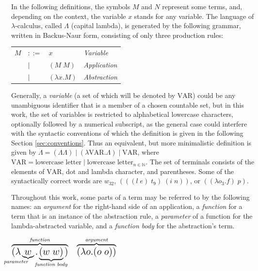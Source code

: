 \documentclass[table, a4paper, 10pt]{article}
\begin{document}
In the following definitions, the symbols $M$ and $N$ represent some terms, and,
depending on the context, the variable $x$ stands for any variable.
The language of $\lambda$-calculus, called $\Lambda$ (capital lambda), is generated by the following
grammar, written in Backus-Naur form, consisting of only three production rules:

\begin{center}
\begin{tabular}{llll}
$M$ &$::=$             &$x$              & {\small\hspace{0.4cm}\textit{Variable}}\\
    &\hspace{0.1cm}$|$ &$(M\;M)$         & {\small\hspace{0.4cm}\textit{Application}}\\
    &\hspace{0.1cm}$|$ &$(\lambda x.M)$  & {\small\hspace{0.4cm}\textit{Abstraction}}
\end{tabular}
\end{center}
Generally, a \textit{variable} (a set of which will be denoted by $\mathrm{VAR}$)
could be any unambiguous identifier 
that is a member of a chosen countable set, but in this work, the set
of variables is restricted to
alphabetical lowercase characters, optionally followed by a numerical subscript,
as the general case could interfere with the syntactic conventions
of which the definition is given in the following Section \ref{sec:conventions}.
Thus an equivalent, but more minimalistic definition is given by
$\Lambda = (\Lambda \Lambda)\;|\;(\lambda \mathrm{VAR}.\Lambda)\;|\;\mathrm{VAR}$, where
$\mathrm{VAR} = \text{lowercase letter}\;|\;\text{lowercase letter}_{n \in \mathbb{N}}$.
The set of terminals consists of the elements of $\mathrm{VAR}$, dot and lambda character, and parentheses.
Some of the syntactically correct words are $w_{32}$, $(((l\;e)\;t_9)\;(i\;n))$, or $((\lambda o_3.f)\;p)$.

Throughout this work, some parts of a term may be referred to by the following names:
an \textit{argument} for the right-hand side of an application, a \textit{function} for a term that is an instance of the 
abstraction rule, a \textit{parameter} of a function for the lambda-abstracted variable, and a \textit{function body}
for the abstraction's term.

\begin{center}
$\overbrace{\text{\Large$(\lambda$}\underbrace{\Large\text{$w$}}_{\mathllap{\textit{parameter}}}
\text{\Large$.$}\underbrace{\text{\Large$(w\;w)$}}_{\mathclap{\textit{function~body}}}\text{\Large$)$}}^{\textit{function}}
\text{\Large~~}
\overbrace{\text{\Large$(\lambda o.(o\;o))$}}^{\textit{argument}}
$
\end{center}
\end{document}
